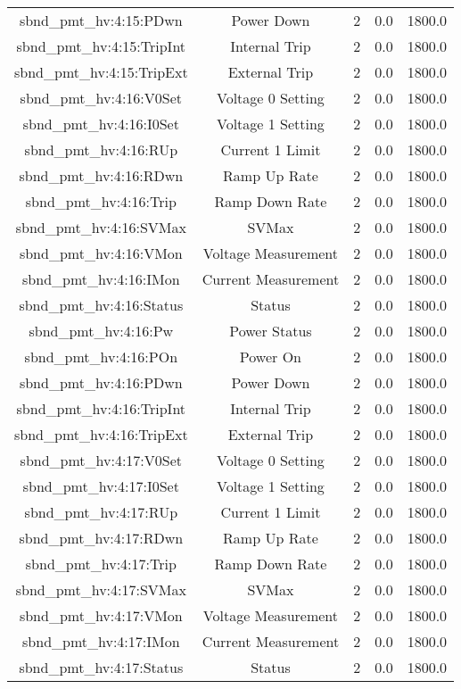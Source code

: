 \begin{table}[ptb]
\begin{tabular}{c | c c c c}
sbnd_pmt_hv:4:15:PDwn & Power Down & 2 & 0.0 & 1800.0\\ 
sbnd_pmt_hv:4:15:TripInt & Internal Trip & 2 & 0.0 & 1800.0\\ 
sbnd_pmt_hv:4:15:TripExt & External Trip & 2 & 0.0 & 1800.0\\ 
sbnd_pmt_hv:4:16:V0Set & Voltage 0 Setting & 2 & 0.0 & 1800.0\\ 
sbnd_pmt_hv:4:16:I0Set & Voltage 1 Setting & 2 & 0.0 & 1800.0\\ 
sbnd_pmt_hv:4:16:RUp & Current 1 Limit & 2 & 0.0 & 1800.0\\ 
sbnd_pmt_hv:4:16:RDwn & Ramp Up Rate & 2 & 0.0 & 1800.0\\ 
sbnd_pmt_hv:4:16:Trip & Ramp Down Rate & 2 & 0.0 & 1800.0\\ 
sbnd_pmt_hv:4:16:SVMax & SVMax & 2 & 0.0 & 1800.0\\ 
sbnd_pmt_hv:4:16:VMon & Voltage Measurement & 2 & 0.0 & 1800.0\\ 
sbnd_pmt_hv:4:16:IMon & Current Measurement & 2 & 0.0 & 1800.0\\ 
sbnd_pmt_hv:4:16:Status & Status & 2 & 0.0 & 1800.0\\ 
sbnd_pmt_hv:4:16:Pw & Power Status & 2 & 0.0 & 1800.0\\ 
sbnd_pmt_hv:4:16:POn & Power On & 2 & 0.0 & 1800.0\\ 
sbnd_pmt_hv:4:16:PDwn & Power Down & 2 & 0.0 & 1800.0\\ 
sbnd_pmt_hv:4:16:TripInt & Internal Trip & 2 & 0.0 & 1800.0\\ 
sbnd_pmt_hv:4:16:TripExt & External Trip & 2 & 0.0 & 1800.0\\ 
sbnd_pmt_hv:4:17:V0Set & Voltage 0 Setting & 2 & 0.0 & 1800.0\\ 
sbnd_pmt_hv:4:17:I0Set & Voltage 1 Setting & 2 & 0.0 & 1800.0\\ 
sbnd_pmt_hv:4:17:RUp & Current 1 Limit & 2 & 0.0 & 1800.0\\ 
sbnd_pmt_hv:4:17:RDwn & Ramp Up Rate & 2 & 0.0 & 1800.0\\ 
sbnd_pmt_hv:4:17:Trip & Ramp Down Rate & 2 & 0.0 & 1800.0\\ 
sbnd_pmt_hv:4:17:SVMax & SVMax & 2 & 0.0 & 1800.0\\ 
sbnd_pmt_hv:4:17:VMon & Voltage Measurement & 2 & 0.0 & 1800.0\\ 
sbnd_pmt_hv:4:17:IMon & Current Measurement & 2 & 0.0 & 1800.0\\ 
sbnd_pmt_hv:4:17:Status & Status & 2 & 0.0 & 1800.0\\ 

\end{tabular}
\end{table}

